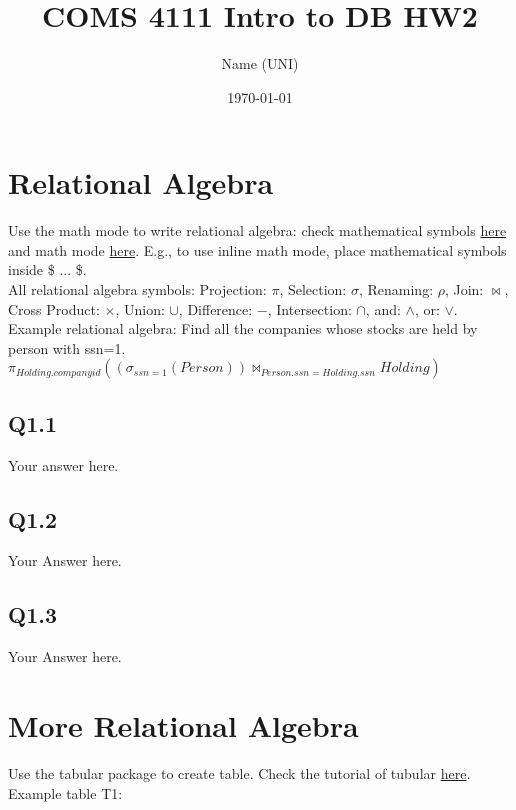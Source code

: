 \documentclass{article}
\title{COMS 4111 Intro to DB HW2}
\author{Name (UNI)}
\date{\today}
\begin{document}
\maketitle



\pagebreak

\section{Relational Algebra}

Use the math mode to write relational algebra: check  mathematical symbols \href{https://www.caam.rice.edu/~heinken/latex/symbols.pdf}{here} and math mode \href{https://www.overleaf.com/learn/latex/Mathematical_expressions}{here}. 
E.g., to use inline math mode, place mathematical symbols inside \$ ... \$.\\
All relational algebra symbols:
Projection: $\pi$, Selection: $\sigma$, Renaming: $\rho$, Join: $\bowtie$, Cross Product: $\times$, Union: $\cup$, Difference: $-$, Intersection: $\cap$, and: $\wedge$, or: $\vee$.\\
Example relational algebra: Find all the companies whose stocks are held by person with ssn=1. $\pi_{Holding.companyid}((\sigma_{ssn=1}(Person))\bowtie_{Person.ssn = Holding.ssn} Holding)$

\subsection{Q1.1}
Your answer here.


\subsection{Q1.2}
Your Answer here.


\subsection{Q1.3}
Your Answer here.

\newpage



\section{More Relational Algebra}

Use the tabular package to create table. Check the tutorial of tubular \href{https://www.overleaf.com/learn/latex/Tables}{here}.
Example table T1:
\end{document}
